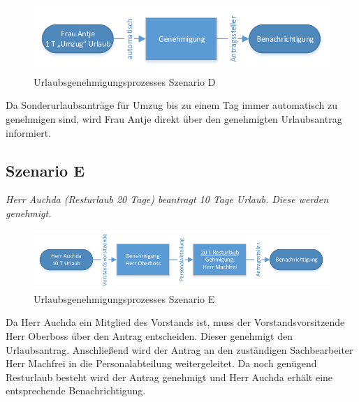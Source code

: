 \begin{figure}[H]
\centering
\includegraphics[width=0.75\linewidth]{Bilder/BeispielD}
\caption{Urlaubsgenehmigungsprozesses Szenario D}
\label{fig:BeispielD}
\end{figure}

Da Sonderurlaubsanträge für Umzug bis zu einem Tag immer automatisch zu genehmigen sind, wird Frau Antje direkt über den genehmigten Urlaubsantrag informiert.

\subsection{Szenario E}
\textit{Herr Auchda (Resturlaub 20 Tage) beantragt 10 Tage Urlaub. Diese werden genehmigt.}

\begin{figure}[H]
\centering
\includegraphics[width=1.0\linewidth]{Bilder/BeispielE}
\caption{Urlaubsgenehmigungsprozesses Szenario E}
\label{fig:BeispielE}
\end{figure}

Da Herr Auchda ein Mitglied des Vorstands ist, muss der Vorstandsvorsitzende Herr Oberboss über den Antrag entscheiden. Dieser genehmigt den Urlaubsantrag. Anschließend wird der Antrag an den zuständigen Sachbearbeiter Herr Machfrei in die Personalabteilung weitergeleitet. Da noch genügend Resturlaub besteht wird der Antrag genehmigt und Herr Auchda erhält eine entsprechende Benachrichtigung.
